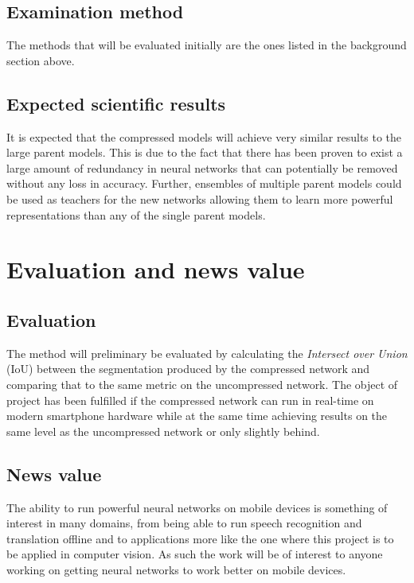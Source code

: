 \documentclass[11pt]{article}
\begin{document}
\subsection{Examination method}
\label{sec:orgc2753bd}
The methods that will be evaluated initially are the ones listed in the background section above. 

\subsection{Expected scientific results}
\label{sec:org58e0ebd}
It is expected that the compressed models will achieve very similar results to the large parent models. This is due to the fact that there has been proven to exist a large amount of redundancy in neural networks that can potentially be removed without any loss in accuracy. Further, ensembles of multiple parent models could be used as teachers for the new networks allowing them to learn more powerful representations than any of the single parent models.
\section{Evaluation and news value}
\label{sec:org8d410c2}
\subsection{Evaluation}
\label{sec:orge57b378}
The method will preliminary be evaluated by calculating the \emph{Intersect over Union} (IoU) between the segmentation produced by the compressed network and comparing that to the same metric on the uncompressed network. The object of project has been fulfilled if the compressed network can run in real-time on modern smartphone hardware while at the same time achieving results on the same level as the uncompressed network or only slightly behind.

\subsection{News value}
\label{sec:org9ea72c7}
The ability to run powerful neural networks on mobile devices is something of interest in many domains, from being able to run speech recognition and translation offline and to applications more like the one where this project is to be applied in computer vision. As such the work will be of interest to anyone working on getting neural networks to work better on mobile devices.
\end{document}
